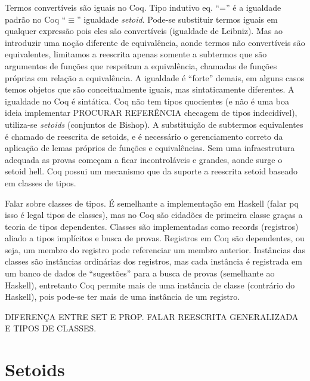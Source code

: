 Termos convertíveis são iguais no Coq. Tipo indutivo eq. ``='' é a igualdade padrão no Coq ``$\equiv$'' igualdade \textit{setoid}. Pode-se substituir termos iguais em qualquer expressão pois eles são convertíveis (igualdade de Leibniz).
Mas ao introduzir uma noção diferente de equivalência, aonde termos não convertíveis são equivalentes, limitamos a reescrita
apenas somente a subtermos que são argumentos de funções que respeitam a equivalência, chamadas de funções próprias em relação a equivalência. A igualdade é ``forte'' demais, em alguns casos temos objetos que são conceitualmente iguais, mas sintaticamente diferentes. A igualdade no Coq é sintática. Coq não tem tipos quocientes (e não é uma boa ideia implementar PROCURAR REFERÊNCIA checagem de tipos indecidível), utiliza-se \textit{setoids} (conjuntos de Bishop). A substituição de subtermos equivalentes é chamado de reescrita de setoids, e é necessário o gerenciamento correto da aplicação de lemas próprios de funções e equivalências. Sem uma infraestrutura adequada as provas começam a ficar incontroláveis e grandes, aonde surge o setoid hell. Coq possui um mecanismo que da suporte a reescrita setoid baseado em classes de tipos.


Falar sobre classes de tipos. É semelhante a implementação em Haskell (falar pq isso é legal tipos de classes), mas no Coq são cidadões de primeira classe graças a teoria de tipos dependentes. Classes são implementadas como records (registros) aliado a tipos implícitos e busca de provas. Registros em Coq são dependentes, ou seja, um membro do registro pode referenciar um membro anterior. Instâncias das classes são instâncias ordinárias dos registros, mas cada instância é registrada em um banco de dados de ``sugestões'' para a busca de provas (semelhante ao Haskell), entretanto Coq permite mais de uma instância de classe (contrário do Haskell), pois pode-se ter mais de uma instância de um registro.

DIFERENÇA ENTRE SET E PROP. FALAR REESCRITA GENERALIZADA E TIPOS DE CLASSES.
\section{Setoids}